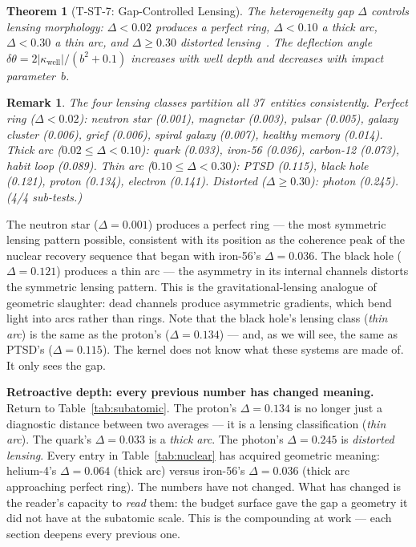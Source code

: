 \documentclass[
  aps,
  prd,
  twocolumn,
  superscriptaddress,
  nofootinbib,
  floatfix
]{revtex4-2}
\newtheorem{theorem}{Theorem}
\newtheorem{remark}{Remark}
\begin{document}
\begin{theorem}[T-ST-7: Gap-Controlled Lensing]\label{thm:T7}
The heterogeneity gap $\Delta$ controls lensing morphology:
$\Delta < 0.02$ produces a perfect ring, $\Delta < 0.10$ a
thick arc, $\Delta < 0.30$ a thin arc, and $\Delta \geq 0.30$
distorted
lensing~\cite{schneider1992gravitational,refsdal1964gravitational}.
The deflection angle
$\delta\theta = 2|\kappa_{\mathrm{well}}|/(b^2 + 0.1)$
increases with well depth and decreases with impact
parameter~$b$.
\end{theorem}

\begin{remark}
The four lensing classes partition all 37~entities
consistently.  Perfect ring ($\Delta < 0.02$): neutron star
(0.001), magnetar (0.003), pulsar (0.005), galaxy cluster
(0.006), grief (0.006), spiral galaxy (0.007), healthy memory
(0.014).  Thick arc ($0.02 \leq \Delta < 0.10$): quark (0.033),
iron-56 (0.036), carbon-12 (0.073), habit loop (0.089).
Thin arc ($0.10 \leq \Delta < 0.30$): PTSD (0.115), black
hole (0.121), proton (0.134), electron (0.141).  Distorted
($\Delta \geq 0.30$): photon (0.245).  (4/4 sub-tests.)
\end{remark}

The neutron star ($\Delta = 0.001$) produces a perfect ring ---
the most symmetric lensing pattern possible, consistent with
its position as the coherence peak of the nuclear recovery
sequence that began with iron-56's $\Delta = 0.036$.
The black hole ($\Delta = 0.121$) produces a thin arc ---
the asymmetry in its internal channels distorts the symmetric
lensing pattern.  This is the gravitational-lensing analogue
of geometric slaughter: dead channels produce asymmetric
gradients, which bend light into arcs rather than rings.
Note that the black hole's lensing class (\emph{thin arc})
is the same as the proton's ($\Delta = 0.134$) --- and, as
we will see, the same as PTSD's ($\Delta = 0.115$).  The
kernel does not know what these systems are made of.  It
only sees the gap.

\textbf{Retroactive depth: every previous number has changed
meaning.}
Return to Table~\ref{tab:subatomic}.  The proton's
$\Delta = 0.134$ is no longer just a diagnostic distance
between two averages --- it is a lensing classification
(\emph{thin arc}).  The quark's $\Delta = 0.033$ is a
\emph{thick arc}.  The photon's $\Delta = 0.245$ is
\emph{distorted lensing}.  Every entry in
Table~\ref{tab:nuclear} has acquired geometric meaning:
helium-4's $\Delta = 0.064$ (thick arc) versus iron-56's
$\Delta = 0.036$ (thick arc approaching perfect ring).
The numbers have not changed.  What has changed is the reader's
capacity to \emph{read} them: the budget surface gave the gap
a geometry it did not have at the subatomic scale.  This is the
compounding at work --- each section deepens every previous one.
\end{document}
